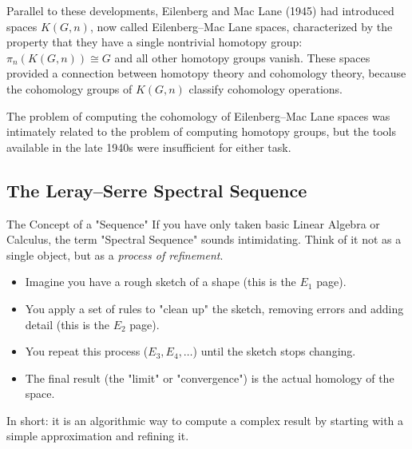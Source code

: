 Parallel to these developments, Eilenberg and Mac Lane (1945) had introduced spaces $K(G, n)$, now called Eilenberg--Mac Lane spaces, characterized by the property that they have a single nontrivial homotopy group: $\pi_n(K(G, n)) \cong G$ and all other homotopy groups vanish. These spaces provided a connection between homotopy theory and cohomology theory, because the cohomology groups of $K(G, n)$ classify cohomology operations.

The problem of computing the cohomology of Eilenberg--Mac Lane spaces was intimately related to the problem of computing homotopy groups, but the tools available in the late 1940s were insufficient for either task.

\subsection{The Leray--Serre Spectral Sequence}

\begin{knowledgebridge}{The Concept of a "Sequence"}
If you have only taken basic Linear Algebra or Calculus, the term "Spectral Sequence" sounds intimidating. Think of it not as a single object, but as a \emph{process of refinement}.
\begin{itemize}
    \item Imagine you have a rough sketch of a shape (this is the $E_1$ page).
    \item You apply a set of rules to "clean up" the sketch, removing errors and adding detail (this is the $E_2$ page).
    \item You repeat this process ($E_3, E_4, \dots$) until the sketch stops changing.
    \item The final result (the "limit" or "convergence") is the actual homology of the space.
\end{itemize}
In short: it is an algorithmic way to compute a complex result by starting with a simple approximation and refining it.
\end{knowledgebridge}

